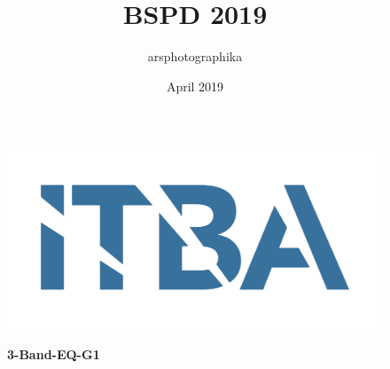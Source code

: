 \documentclass[a4paper,12pt,oneside,pdflatex,italian,final,twocolumn]{article}
\title{BSPD 2019}
\author{arsphotographika }
\date{April 2019}
\begin{document}
\pagestyle{fancy}



\onecolumn

\begin{figure}
  \begin{minipage}{0.47\textwidth}
    \centering
    \includegraphics[width=.7\textwidth,left,]{logo}

  \end{minipage}
  \hfill
  \begin{minipage}{0.47\textwidth}
    \raggedleft
    \Huge \textbf{3-Band-EQ-G1}
  \end{minipage}
\end{figure}
\end{document}
